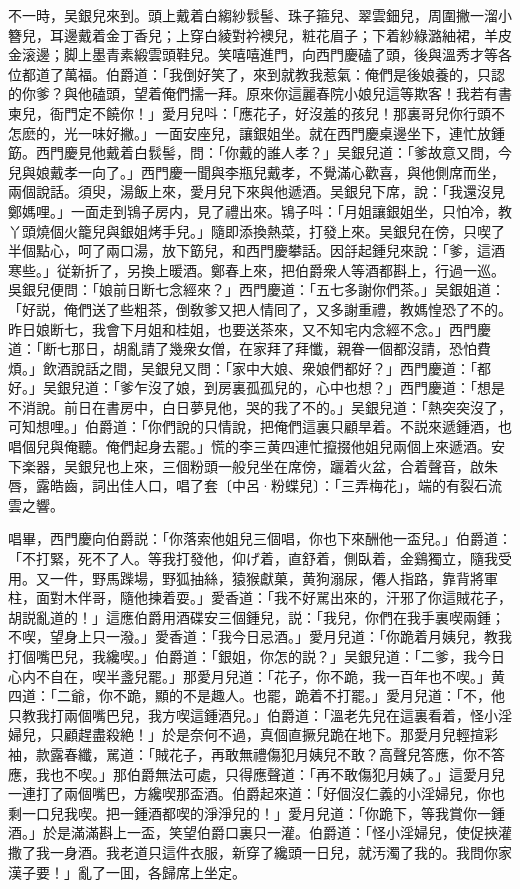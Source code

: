 不一時，吴銀兒來到。頭上戴着白縐紗䯼髻、珠子箍兒、翠雲鈿兒，周圍撇一溜小簪兒，耳邊戴着金丁香兒；上穿白綾對衿襖兒，粧花眉子；下着紗綠潞紬裙，羊皮金滚邊；脚上墨青素緞雲頭鞋兒。笑嘻嘻進門，向西門慶磕了頭，後與溫秀才等各位都道了萬福。伯爵道：「我倒好笑了，來到就教我惹氣：俺們是後娘養的，只認的你爹？與他磕頭，望着俺們擩一拜。原來你這麗春院小娘兒這等欺客！我若有書柬兒，衙門定不饒你！」愛月兒呌：「應花子，好沒羞的孩兒！那裏哥兒你行頭不怎麽的，光一味好撇。」一面安座兒，讓銀姐坐。就在西門慶桌邊坐下，連忙放鍾筯。西門慶見他戴着白䯼髻，問：「你戴的誰人孝？」吴銀兒道：「爹故意又問，今兒與娘戴孝一向了。」西門慶一聞與李瓶兒戴孝，不覺滿心歡喜，與他側席而坐，兩個說話。須臾，湯飯上來，愛月兒下來與他遞酒。吴銀兒下席，說：「我還沒見鄭媽哩。」一面走到鴇子房内，見了禮出來。鴇子呌：「月姐讓銀姐坐，只怕冷，教丫頭燒個火籠兒與銀姐烤手兒。」隨即添換熱菜，打發上來。吴銀兒在傍，只喫了半個點心，呵了兩口湯，放下筯兒，和西門慶攀話。因㧱起鍾兒來說：「爹，這酒寒些。」従新折了，另換上暖酒。鄭春上來，把伯爵衆人等酒都斟上，行過一巡。吳銀兒便問：「娘前日断七念經來？」西門慶道：「五七多謝你們茶。」吴銀姐道：「好説，俺們送了些粗茶，倒敎爹又把人情囘了，又多謝重禮，教媽惶恐了不的。昨日娘断七，我會下月姐和桂姐，也要送茶來，又不知宅内念經不念。」西門慶道：「断七那日，胡亂請了幾衆女僧，在家拜了拜懺，親眷一個都沒請，恐怕費煩。」飲酒說話之間，吴銀兒又問：「家中大娘、衆娘們都好？」西門慶道：「都好。」吴銀兒道：「爹乍沒了娘，到房裏孤孤兒的，心中也想？」西門慶道：「想是不消說。前日在書房中，白日夢見他，哭的我了不的。」吴銀兒道：「熱突突沒了，可知想哩。」伯爵道：「你們說的只情說，把俺們這裏只顧旱着。不説來遞鍾酒，也唱個兒與俺聽。俺們起身去罷。」慌的李三黄四連忙攛掇他姐兒兩個上來遞酒。安下楽器，吴銀兒也上來，三個粉頭一般兒坐在席傍，躧着火盆，合着聲音，啟朱唇，露皓齒，詞出佳人口，唱了套〔中呂·粉蝶兒〕：「三弄梅花」，端的有裂石流雲之響。

唱畢，西門慶向伯爵説：「你落索他姐兒三個唱，你也下來酬他一盃兒。」伯爵道：「不打緊，死不了人。等我打發他，仰げ着，直舒着，側臥着，金鷄獨立，隨我受用。又一件，野馬䠕場，野狐抽絲，猿猴獻菓，黄狗溺尿，僊人指路，靠背將軍柱，面對木伴哥，隨他揀着耍。」愛香道：「我不好駡出來的，汗邪了你這賊花子，胡説亂道的！」這應伯爵用酒碟安三個鍾兒，説：「我兒，你們在我手裏喫兩鍾；不喫，望身上只一潑。」愛香道：「我今日忌酒。」愛月兒道：「你跪着月姨兒，教我打個嘴巴兒，我纔喫。」伯爵道：「銀姐，你怎的説？」吴銀兒道：「二爹，我今日心内不自在，喫半盞兒罷。」那愛月兒道：「花子，你不跪，我一百年也不喫。」黄四道：「二爺，你不跪，顯的不是趣人。也罷，跪着不打罷。」愛月兒道：「不，他只教我打兩個嘴巴兒，我方喫這鍾酒兒。」伯爵道：「溫老先兒在這裏看着，怪小淫婦兒，只顧趕盡殺絶！」於是奈何不過，真個直撅兒跪在地下。那愛月兒輕揎彩袖，款露春纖，駡道：「賊花子，再敢無禮傷犯月姨兒不敢？高聲兒答應，你不答應，我也不喫。」那伯爵無法可處，只得應聲道：「再不敢傷犯月姨了。」這愛月兒一連打了兩個嘴巴，方纔喫那盃酒。伯爵起來道：「好個沒仁義的小淫婦兒，你也剩一口兒我喫。把一鍾酒都喫的淨淨兒的！」愛月兒道：「你跪下，等我賞你一鍾酒。」於是滿滿斟上一盃，笑望伯爵口裏只一灌。伯爵道：「怪小淫婦兒，使促挾灌撒了我一身酒。我老道只這件衣服，新穿了纔頭一日兒，就汚濁了我的。我問你家漢子要！」亂了一囬，各歸席上坐定。

